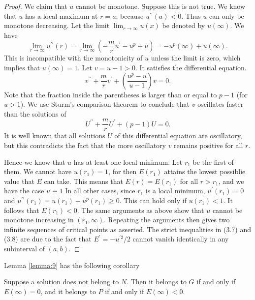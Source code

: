 \begin{proof}
  We claim that $u$ cannot be monotone. Suppose this is not true.
  We know that $u$ has a local maximum at $r=a$, because $u^{\prime \prime}(a)<0$.
  Thus $u$ can only be monotone decreasing.
  Let the limit $\lim _{r \rightarrow \infty} u(x)$ be denoted by $u(\infty)$.
  We have
  \[
    \lim _{r \rightarrow \infty} u^{\prime \prime}(r)
      = \lim _{r \rightarrow \infty}\left(-\frac{m}{r} u^{\prime}-u^p+u\right)
      = -u^p(\infty)+u(\infty).
  \]
  This is incompatible with the monotonicity of $u$ unless the limit is zero,
  which implies that $u(\infty)=1$. Let $v=u-1>0$. It satisfies the differential equation.
  \[
    v^{\prime \prime}+\frac{m}{r} v^{\prime}+\left(\frac{u^p-u}{u-1}\right) v = 0.
  \]
  Note that the fraction inside the parentheses is
  larger than or equal to $p-1$ (for $u>1$).
  We use Sturm's comparison theorem to conclude that $v$ oscillates
  faster than the solutions of
  \[
    U^{\prime \prime}+\frac{m}{r} U^{\prime}+(p-1) U=0 .
  \]
  It is well known that all solutions $U$ of this differential equation are oscillatory,
  but this contradicts the fact that the more oscillatory $v$ remains positive
  for all $r$.

  Hence we know that $u$ has at least one local minimum. Let $r_1$ be the first of them.
  We cannot have $u\left(r_1\right)=1$, for then $E\left(r_1\right)$ attains the lowest
  possiblie value that $E$ can take. This means that $E(r)=E\left(r_1\right)$ for all $r>r_1$,
  and we have the case $u \equiv 1$ In all other cases, since $r_1$ is a local minimum,
  $u^{\prime}\left(r_1\right)=0$ and 
  $u^{\prime \prime}\left(r_1\right)=u\left(r_1\right)-u^p\left(r_1\right) \geq 0$.
  This can hold only if $u\left(r_1\right)<1$. It follows that $E\left(r_1\right)<0$.
  The same arguments as above show that $u$ cannot be monotone increasing
  in $\left(r_1, \infty\right)$.
  Repeating the arguments then gives two infinite sequences of critical points as asserted.
  The strict inequalities in (3.7) and (3.8) are due to the fact
  that $E^{\prime}=-u^{\prime 2} / 2$ cannot vanish identically
  in any subinterval of $(a, b)$.
\end{proof}

Lemma \ref{lemma:9} has the following corollary


\begin{lemma}\label{lemma:10}
  Suppose a solution does not belong to $N$. Then it belongs to $G$ if and only if $E(\infty)=0$, and it belongs to $P$ if and only if $E(\infty)<0$.
\end{lemma}

